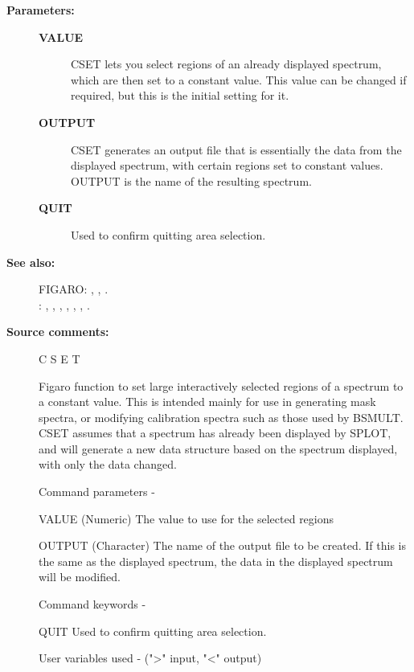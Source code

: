 \begin{description}
\begin{description}
\item [\textbf{Parameters:}]
\begin{description}
\item [\textbf{VALUE}]
 CSET lets you select regions of an already displayed spectrum, which
 are then set to a constant value.  This value can be changed if
 required, but this is the initial setting for it.
\item [\textbf{OUTPUT}]
 CSET generates an output file that is essentially the data from the
 displayed spectrum, with certain regions set to constant values.
 OUTPUT is the name of the resulting spectrum.
\item [\textbf{QUIT}]
 Used to confirm quitting area selection.
\end{description}

\item [\textbf{See also:}]
FIGARO: , , .\\
: , , , , , , .\\

\item [\textbf{Source comments:}]
\begin{terminalv}
 C S E T

 Figaro function to set large interactively selected regions
 of a spectrum to a constant value.  This is intended mainly
 for use in generating mask spectra, or modifying calibration
 spectra such as those used by BSMULT.  CSET assumes that a
 spectrum has already been displayed by SPLOT, and will generate
 a new data structure based on the spectrum displayed, with
 only the data changed.

 Command parameters -

 VALUE       (Numeric) The value to use for the selected regions

 OUTPUT      (Character) The name of the output file to
             be created.  If this is the same as the displayed
             spectrum, the data in the displayed spectrum will
             be modified.

 Command keywords -

 QUIT        Used to confirm quitting area selection.

 User variables used -  (">" input, "<" output)


\end{terminalv}
\end{description}
\end{description}
